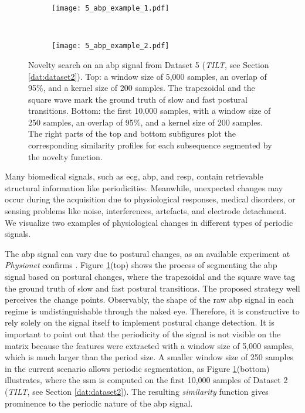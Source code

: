 \begin{figure}
    \centering
    \begin{subfigure}[b]{\textwidth}
         \centering
         \texttt{[image: 5\_abp\_example\_1.pdf]}
    \end{subfigure}\\
    \vspace{5mm}
    \begin{subfigure}[b]{\textwidth}
         \centering
         \texttt{[image: 5\_abp\_example\_2.pdf]}
    \end{subfigure}
    \caption{Novelty search on an \gls{abp} signal from Dataset 5 (\textit{TILT}, see Section \ref{dat:dataset2}). Top: a window size of 5,000 samples, an overlap of 95\%, and a kernel size of 200 samples. The trapezoidal and the square wave mark the ground truth of slow and fast postural transitions. Bottom: the first 10,000 samples, with a window size of 250 samples, an overlap of 95\%, and a kernel size of 200 samples. The right parts of the top and bottom subfigures plot the corresponding similarity profiles for each subsequence segmented by the novelty function.}
    \label{fig:use_case2}
\end{figure}

Many biomedical signals, such as \gls{ecg}, \gls{abp}, and \gls{resp}, contain retrievable structural information like periodicities. Meanwhile, unexpected changes may occur during the acquisition due to physiological responses, medical disorders, or sensing problems like noise, interferences, artefacts, and electrode detachment. We visualize two examples of physiological changes in different types of periodic signals.

The \gls{abp} signal can vary due to postural changes, as an available experiment at \textit{Physionet} confirms \cite{tilt, PhBank}. Figure \ref{fig:use_case2}(top) shows the process of segmenting the \gls{abp} signal based on postural changes, where the trapezoidal and the square wave tag the ground truth of slow and fast postural transitions. The proposed strategy well perceives the change points. Observably, the shape of the raw \gls{abp} signal in each regime is undistinguishable through the naked eye. Therefore, it is constructive to rely solely on the signal itself to implement postural change detection. It is important to point out that the periodicity of the signal is not visible on the matrix because the features were extracted with a window size of 5,000 samples, which is much larger than the period size. A smaller window size of 250 samples in the current scenario allows periodic segmentation, as Figure \ref{fig:use_case2}(bottom) illustrates, where the \gls{ssm} is computed on the first 10,000 samples of Dataset 2 (\textit{TILT}, see Section \ref{dat:dataset2}).
The resulting \textit{similarity} function gives prominence to the periodic nature of the \gls{abp} signal.

